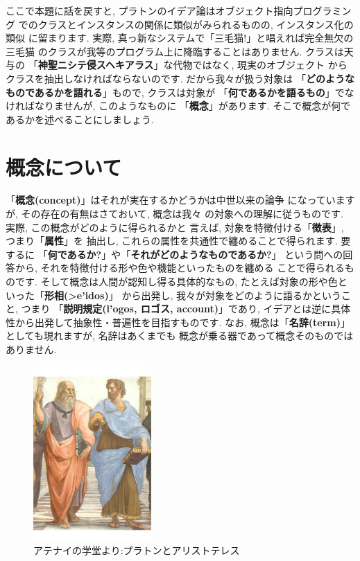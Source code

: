ここで本題に話を戻すと, プラトンのイデア論はオブジェクト指向プログラミング
でのクラスとインスタンスの関係に類似がみられるものの, インスタンス化の類似
に留まります. 実際, 真っ新なシステムで「三毛猫!」と唱えれば完全無欠の三毛猫
のクラスが我等のプログラム上に降臨することはありません. クラスは天与の
「\textbf{神聖ニシテ侵スヘキアラス}」な代物ではなく, 現実のオブジェクト
からクラスを抽出しなければならないのです. だから我々が扱う対象は
「\textbf{どのようなものであるかを語れる}」もので, クラスは対象が
「\textbf{何であるかを語るもの}」でなければなりませんが, このようなものに
「\textbf{概念}」があります. そこで概念が何であるかを述べることにしましょう.
\newpage

\section{概念について}

「\textbf{概念(concept)}」はそれが実在するかどうかは中世以来の論争
\cite{普遍論争}になっていますが, その存在の有無はさておいて, 概念は我々
の対象への理解に従うものです. 実際, この概念がどのように得られるかと
言えば, 対象を特徴付ける「\textbf{徴表}」, つまり「\textbf{属性}」を
抽出し, これらの属性を共通性で纏めることで得られます. 要するに
「\textbf{何であるか?}」や「\textbf{それがどのようなものであるか?}」
という問への回答から, それを特徴付ける形や色や機能といったものを纏める
ことで得られるものです. そして概念は人間が認知し得る具体的なもの,
 たとえば対象の形や色といった「\textbf{形相(\textgreek{>e'idos})}」
から出発し, 我々が対象をどのように語るかということ, つまり
「\textbf{説明規定(\textgreek{l'ogos}, ロゴス, account)}」であり,
 イデアとは逆に具体性から出発して抽象性・普遍性を目指すものです. なお,
 概念は「\textbf{名辞(term)}」としても現れますが, 名辞はあくまでも
概念が乗る器であって概念そのものではありません.
\newline

\begin{figure}
\includegraphics[width=4.5cm]{Plato_and_Aristotle_in_The_School_of_Athens,_by_italian_Rafael.pdf}
\caption{アテナイの学堂より:プラトンとアリストテレス}
\label{fig:Plato-Aristotle}
\end{figure}

